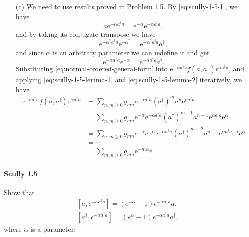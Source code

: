 \documentclass[hyperref, a4paper]{article}
\newcommand*{\ee}{\mathrm{e}}
\begin{document}
\begin{itemize}
\item[(c)] We need to use results proved in Problem 1.5. By \eqref{eq:scully-1-5-1}, we have
\begin{equation}
    a \ee^{- \alpha a^\dagger a} = \ee^{- \alpha} \ee^{- \alpha a^\dagger a}, 
    \label{eq:scully-1-5-lemma-1}
\end{equation}
and by taking its conjugate transpose we have
\[
    \ee^{- \alpha^* a^\dagger a} \ee^{- \alpha^*} = \ee^{- \alpha^* a^\dagger a} a^\dagger,
\]
and since $\alpha$ is an arbitrary parameter we can redefine it and get
\begin{equation}
    \ee^{- \alpha a^\dagger a} \ee^{- \alpha} = \ee^{- \alpha a^\dagger a} a^\dagger.
    \label{eq:scully-1-5-lemma-2}
\end{equation}
Substituting \eqref{eq:normal-ordered-general-form} into $\ee^{-\alpha a^\dagger a} f(a, a^\dagger) \ee^{\alpha a^\dagger a}$, and applying \eqref{eq:scully-1-5-lemma-1} and \eqref{eq:scully-1-5-lemma-2} iteratively, we have
\[
    \begin{aligned}
        \ee^{-\alpha a^\dagger a} f(a, a^\dagger) \ee^{\alpha a^\dagger a} &= \sum_{n, m \geq 0} g_{mn} \ee^{-\alpha a^\dagger a} (a^\dagger)^m a^n \ee^{\alpha a^\dagger a} \\
        &= \sum_{n, m \geq 0} g_{mn} \ee^{-\alpha} \ee^{-\alpha a^\dagger a} (a^\dagger)^{m-1} a^{n-1} \ee^{\alpha a^\dagger a} \ee^{\alpha} \\
        &= \sum_{n, m \geq 0} g_{mn} \ee^{-\alpha} \ee^{-\alpha} \ee^{-\alpha a^\dagger a} (a^\dagger)^{m-2} a^{n-2} \ee^{\alpha a^\dagger a} \ee^{\alpha} \ee^{\alpha} \\
        &= \cdots \\
        &= \sum_{m, n \geq 0} g_{mn} \ee^{-m \alpha} \ee^{}
    \end{aligned}
\]
\end{itemize}

\paragraph{Scully 1.5} Show that
\begin{equation}
    \begin{gathered}
        {\left[a, e^{-\alpha a^{\dagger} a}\right]=\left(e^{-\alpha}-1\right) e^{-\alpha a^{\dagger} a} a}, \\
        {\left[a^{\dagger}, e^{-\alpha a^{\dagger} a}\right]=\left(e^{\alpha}-1\right) e^{-\alpha a^{\dagger} a} a^{\dagger}},
        \end{gathered}
    \label{eq:scully-1-5-1}
\end{equation}
where $\alpha$ is a parameter.
\end{document}
